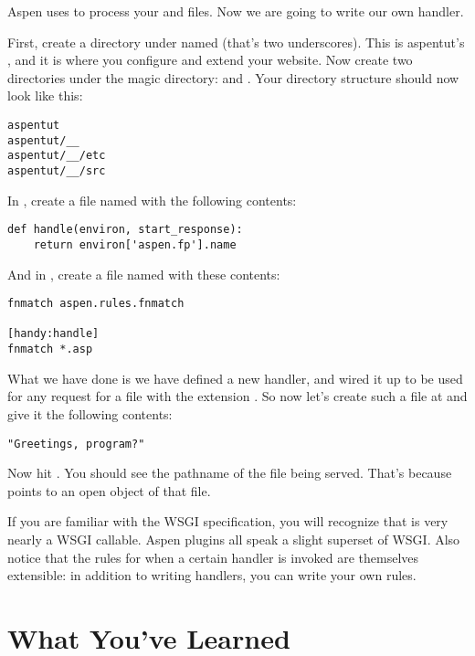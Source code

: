 Aspen uses  to process your  and 
files. Now we are going to write our own handler.

First, create a directory under  named \file{__} (that's two
underscores). This is aspentut's , and it is where you
configure and extend your website. Now create two directories under the magic
directory:  and . Your directory structure should now look
like this:

\begin{verbatim}
aspentut
aspentut/__
aspentut/__/etc
aspentut/__/src
\end{verbatim}

In , create a file named  with the following
contents:

\begin{verbatim}
def handle(environ, start_response):
    return environ['aspen.fp'].name
\end{verbatim}

And in , create a file named  with these
contents:

\begin{verbatim}
fnmatch aspen.rules.fnmatch

[handy:handle]
fnmatch *.asp
\end{verbatim}

What we have done is we have defined a new handler, and wired it up to be used
for any request for a file with the extension . So now let's create
such a file at  and give it the following contents:

\begin{verbatim}
"Greetings, program?"
\end{verbatim}

Now hit . You should see the pathname of
the file being served. That's because  points to an
open  object of that file.

If you are familiar with the WSGI specification, you will recognize that
 is very nearly a WSGI callable. Aspen plugins all speak
a slight superset of WSGI. Also notice that the rules for when a certain handler
is invoked are themselves extensible: in addition to writing handlers, you can
write your own rules.


\section{What You've Learned \label{tutorial-learned}}

